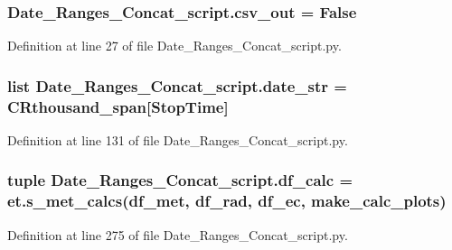 \subsubsection[{csv\+\_\+out}]{\setlength{\rightskip}{0pt plus 5cm}Date\+\_\+\+Ranges\+\_\+\+Concat\+\_\+script.\+csv\+\_\+out = False}\label{namespace_date___ranges___concat__script_aeb5f665fdd491d07f2d8b61e3fe81752}


Definition at line 27 of file Date\+\_\+\+Ranges\+\_\+\+Concat\+\_\+script.\+py.

\hypertarget{namespace_date___ranges___concat__script_ac154a4bf135658a7c4bc6edd240bd2bc}{}
\subsubsection[{date\+\_\+str}]{\setlength{\rightskip}{0pt plus 5cm}list Date\+\_\+\+Ranges\+\_\+\+Concat\+\_\+script.\+date\+\_\+str = {\bf C\+Rthousand\+\_\+span}\mbox{[}\textquotesingle{}Stop\+Time\textquotesingle{}\mbox{]}}\label{namespace_date___ranges___concat__script_ac154a4bf135658a7c4bc6edd240bd2bc}


Definition at line 131 of file Date\+\_\+\+Ranges\+\_\+\+Concat\+\_\+script.\+py.

\hypertarget{namespace_date___ranges___concat__script_a5912818d56cb9479ef5454c9f591cdc6}{}
\subsubsection[{df\+\_\+calc}]{\setlength{\rightskip}{0pt plus 5cm}tuple Date\+\_\+\+Ranges\+\_\+\+Concat\+\_\+script.\+df\+\_\+calc = et.\+s\+\_\+met\+\_\+calcs({\bf df\+\_\+met}, {\bf df\+\_\+rad}, {\bf df\+\_\+ec}, {\bf make\+\_\+calc\+\_\+plots})}\label{namespace_date___ranges___concat__script_a5912818d56cb9479ef5454c9f591cdc6}


Definition at line 275 of file Date\+\_\+\+Ranges\+\_\+\+Concat\+\_\+script.\+py.

\hypertarget{namespace_date___ranges___concat__script_a6b75ca8020ee28148a9e0c6d2772773f}{}
